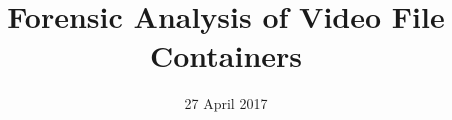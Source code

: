 \documentclass{beamer}
\author{}
\title{\huge Forensic Analysis of Video File Containers}
\date{27 April 2017}
\begin{document}
\titlepageframe



\end{document}
